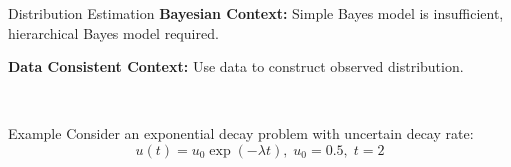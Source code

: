 \begin{block}{Distribution Estimation}
\centering
            {\large \textbf{Bayesian Context:} Simple Bayes model is insufficient, hierarchical Bayes model required.}
           
           {\large \textbf{Data Consistent Context:} Use data to construct observed distribution.}
           
           {\large \  }

             
\end{block}


\begin{block}{Example}
\centering
Consider an exponential decay problem with uncertain decay rate:
\begin{equation*}
       u(t) = u_0\exp(-\lambda t), \; u_0 = 0.5 ,\; t=2
   \end{equation*}


\end{block}
